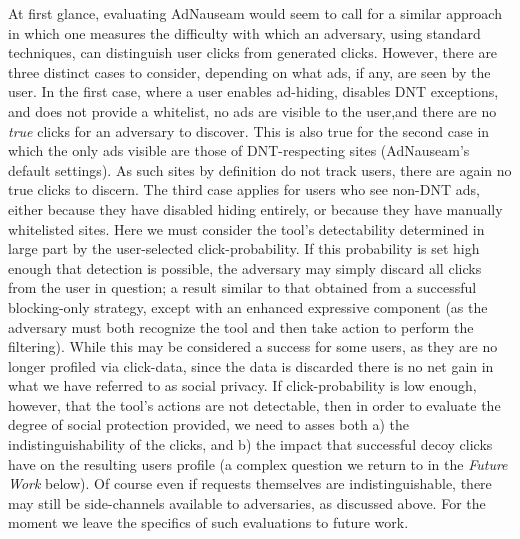 \documentclass[conference]{IEEEtran}
\begin{document}
At first glance, evaluating AdNauseam would seem to call for a similar approach in which one measures the difficulty with which an adversary, using standard techniques, can distinguish user clicks from generated clicks. However, there are three distinct cases to consider, depending on what ads, if any, are seen by the user. In the first case, where a user enables ad-hiding, disables DNT exceptions, and does not provide a whitelist, no ads are visible to the user,and  there are no \emph{true} clicks for an adversary to discover. This is also true for the second case in which the only ads visible are those of DNT-respecting sites (AdNauseam's default settings). As such sites by definition do not track users, there are again no true clicks to discern. The third case applies for users who see non-DNT ads, either because they have disabled hiding entirely, or because they have manually whitelisted sites. Here we must consider the tool's detectability determined in large part by the user-selected click-probability. If this probability is set high enough that detection is possible, the adversary may simply discard all clicks from the user in question; a result similar to that obtained from a successful blocking-only strategy, except with an enhanced expressive component (as the adversary must both recognize the tool and then take action to perform the filtering). While this may be considered a success for some users, as they are no longer profiled via click-data, since the data is discarded there is no net gain in what we have referred to as social privacy. If click-probability is low enough, however, that the tool's actions are not detectable, then in order to evaluate the degree of social protection provided, we need to asses both a) the indistinguishability of the clicks, and b) the impact that successful decoy clicks have on the resulting users profile (a complex question we return to in the \emph{Future Work} below). Of course even if requests themselves are indistinguishable, there may still be side-channels available to adversaries, as discussed above. For the moment we leave the specifics of such evaluations to future work.
\end{document}
